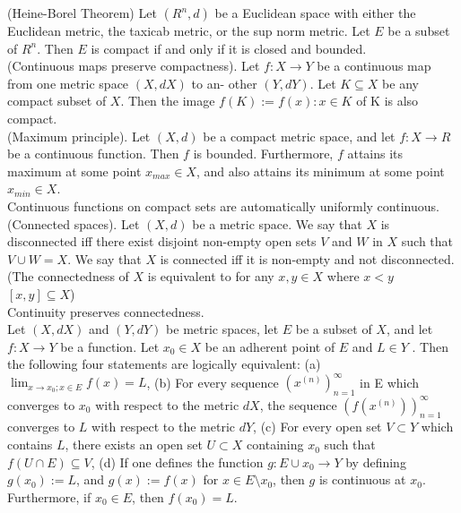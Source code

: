 \documentclass[10pt]{article}
\begin{document}
\begin{small}
    (Heine-Borel Theorem) Let $(R^n,d)$ be a Euclidean space with either the Euclidean metric, the taxicab metric, or the sup norm metric. Let $E$ be a subset of $R^n$. Then $E$ is compact if and only if it is closed and bounded.\\

    (Continuous maps preserve compactness). 
    Let $f : X \rightarrow Y$ be a continuous map from one metric space $(X,dX)$ to an- other $(Y, dY )$. 
    Let $K \subseteq X$ be any compact subset of $X$. Then the image $f(K) := {f(x) : x \in K}$ of K is also compact.\\

    (Maximum principle). 
    Let $(X, d)$ be a compact metric space, and let $f : X \rightarrow R$ be a continuous function. 
    Then $f$ is bounded. 
    Furthermore, $f$ attains its maximum at some point $x_{max} \in X$, and also attains its minimum at some point $x_{min} \in X$.\\
    Continuous functions on compact sets are automatically uniformly continuous.\\

    (Connected spaces). 
    Let $(X, d)$ be a metric space. 
    We say that $X$ is disconnected iff there exist disjoint non-empty open sets $V$ and $W$ in $X$ such that $V \cup W = X$. 
    We say that $X$ is connected iff it is non-empty and not disconnected. (The connectedness of $X$ is equivalent to for any $x,y\in X$ where $x<y$ $[x,y]\subseteq X$)\\
    Continuity preserves connectedness.\\

    Let $(X, dX )$ and $(Y, dY )$ be metric spaces, let $E$ be a subset of $X$, and let $f:X\rightarrow Y$ be a function. Let $x_0 \in X$ be an adherent point of $E$ and $L \in Y$ . Then the following four statements are logically equivalent:
    (a) $\lim_{x\rightarrow x_0;x\in E}f(x)=L$, 
    (b) For every sequence $(x^{(n)})^\infty_{n=1}$ in E which converges to $x_0$ with respect to the metric $dX$, the sequence $(f(x^{(n)}))^\infty_{n=1}$ converges to $L$ with respect to the metric $dY$,
    (c) For every open set $V \subset Y$ which contains $L$, there exists an open set $U\subset X$ containing $x_0$ such that $f(U\cap E)\subseteq V$, 
    (d) If one defines the function $g : E\cup{x_0} \rightarrow Y$ by defining $g(x_0) := L$, and $g(x) := f(x)$ for $x \in E\setminus{x_0}$, then $g$ is continuous at $x_0$. Furthermore, if $x_0 \in E$, then $f(x_0) = L$.\\


\end{small}
\end{document}
